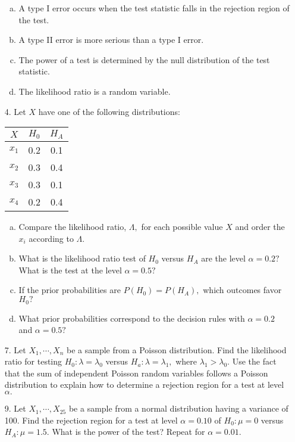 \documentclass{article}
\begin{document}
\begin{itemize}
\begin{enumerate}[a.]
			\item A type I error occurs when the test statistic falls in the rejection region of the test.

			\item A type II error is more serious than a type I error.

			\item The power of a test is determined by the null distribution of the test statistic.

			\item The likelihood ratio is a random variable.
				
		\end{enumerate}

	\item[4.] Let $X$ have one of the following distributions:
		\begin{center}
			\begin{tabular}{ccc}
				$X$ & $H_0$ & $H_A$ \\
				\hline
				$x_1$ & 0.2 & 0.1 \\
				$x_2$ & 0.3 & 0.4 \\
				$x_3$ & 0.3 & 0.1 \\
				$x_4$ & 0.2 & 0.4
			\end{tabular}
		\end{center}

		\begin{enumerate}[a.]
			\item Compare the likelihood ratio, $\Lambda,$ for each possible value $X$ and order the $x_i$ according to $\Lambda.$

			\item What is the likelihood ratio test of $H_0$ versus $H_A$ are the level $\alpha=0.2?$ What is the test at the level $\alpha=0.5?$

			\item If the prior probabilities are $P(H_0)=P(H_A),$ which outcomes favor $H_0?$

			\item What prior probabilities correspond to the decision rules with $\alpha=0.2$ and $\alpha=0.5?$
				
		\end{enumerate}

	\item[7.] Let $X_1, \cdots, X_n$ be a sample from a Poisson distribution. Find the likelihood ratio for testing $H_0:\lambda=\lambda_0$ versus $H_a:\lambda=\lambda_1,$ where $\lambda_1>\lambda_0.$ Use the fact that the sum of independent Poisson random variables follows a Poisson distribution to explain how to determine a rejection region for a test at level $\alpha.$

	\item[9.] Let $X_1,\cdots, X_{25}$ be a sample from a normal distribution having a variance of 100. Find the rejection region for a test at level $\alpha=0.10$ of $H_0:\mu=0$ versus $H_A: \mu=1.5.$ What is the power of the test? Repeat for $\alpha=0.01.$
		
\end{itemize}
\end{document}
